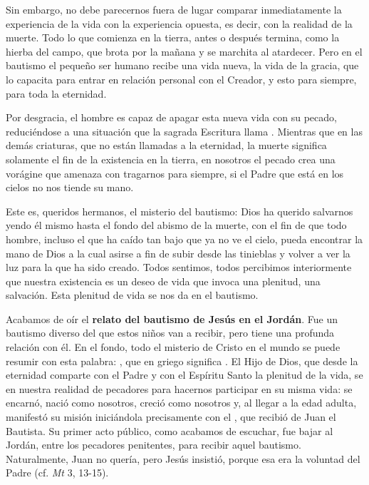 {Sin embargo, no debe parecernos fuera de lugar comparar inmediatamente la experiencia de la vida con la experiencia opuesta, es decir, con la realidad de la muerte. Todo lo que comienza en la tierra, antes o después termina, como la hierba del campo, que brota por la mañana y se marchita al atardecer. Pero en el bautismo el pequeño ser humano recibe una vida nueva, la vida de la gracia, que lo capacita para entrar en relación personal con el Creador, y esto para siempre, para toda la eternidad.

Por desgracia, el hombre es capaz de apagar esta nueva vida con su pecado, reduciéndose a una situación que la sagrada Escritura llama . Mientras que en las demás criaturas, que no están llamadas a la eternidad, la muerte significa solamente el fin de la existencia en la tierra, en nosotros el pecado crea una vorágine que amenaza con tragarnos para siempre, si el Padre que está en los cielos no nos tiende su mano.

Este es, queridos hermanos, el misterio del bautismo: Dios ha querido salvarnos yendo él mismo hasta el fondo del abismo de la muerte, con el fin de que todo hombre, incluso el que ha caído tan bajo que ya no ve el cielo, pueda encontrar la mano de Dios a la cual asirse a fin de subir desde las tinieblas y volver a ver la luz para la que ha sido creado. Todos sentimos, todos percibimos interiormente que nuestra existencia es un deseo de vida que invoca una plenitud, una salvación. Esta plenitud de vida se nos da en el bautismo.

Acabamos de oír el \textbf{relato del bautismo de Jesús en el Jordán}. Fue un bautismo diverso del que estos niños van a recibir, pero tiene una profunda relación con él. En el fondo, todo el misterio de Cristo en el mundo se puede resumir con esta palabra: , que en griego significa . El Hijo de Dios, que desde la eternidad comparte con el Padre y con el Espíritu Santo la plenitud de la vida, se  en nuestra realidad de pecadores para hacernos participar en su misma vida: se encarnó, nació como nosotros, creció como nosotros y, al llegar a la edad adulta, manifestó su misión iniciándola precisamente con el , que recibió de Juan el Bautista. Su primer acto público, como acabamos de escuchar, fue bajar al Jordán, entre los pecadores penitentes, para recibir aquel bautismo. Naturalmente, Juan no quería, pero Jesús insistió, porque esa era la voluntad del Padre (cf. \emph{Mt} 3, 13-15).

}
